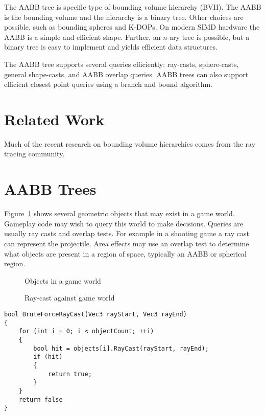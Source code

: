 \documentclass{article}
\begin{document}
The AABB tree is specific type of bounding volume hierarchy (BVH). The AABB is the bounding volume and the hierarchy is a binary tree. Other choices are possible, such as bounding spheres and K-DOPs. On modern SIMD hardware the AABB is a simple and efficient shape. Further, an $n$-ary tree is possible, but a binary tree is easy to implement and yields efficient data structures.

The AABB tree supports several queries efficiently: ray-casts, sphere-casts, general shape-casts, and AABB overlap queries. AABB trees can also support efficient closest point queries using a branch and bound algorithm.

\section{Related Work}
Much of the recent research on bounding volume hierarchies comes from the ray tracing community.

\section{AABB Trees}
Figure~\ref{fig:loose} shows several geometric objects that may exist in a game world. Gameplay code may wish to query this world to make decisions. Queries are usually ray casts and overlap tests. For example in a shooting game a ray cast can represent the projectile. Area effects may use an overlap test to determine what objects are present in a region of space, typically an AABB or spherical region.

\begin{figure}
	\begin{center}
		
	\end{center}
	\caption{Objects in a game world}
	\label{fig:loose}
\end{figure}

\begin{figure}
	\begin{center}
		
	\end{center}
	\caption{Ray-cast against game world}
	\label{fig:raycast}
\end{figure}

\begin{lstlisting}[caption={Brute-force ray-casting}, label={lst:brute_ray}, float]
bool BruteForceRayCast(Vec3 rayStart, Vec3 rayEnd)
{
	for (int i = 0; i < objectCount; ++i)
	{
		bool hit = objects[i].RayCast(rayStart, rayEnd);
		if (hit)
		{
			return true;
		}
	}
	return false
}
\end{lstlisting}
\end{document}
